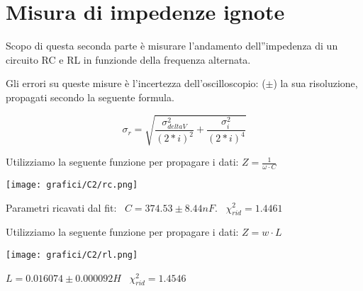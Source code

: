 %
%
%
%
%

\section{Misura di impedenze ignote}

Scopo di questa seconda parte è misurare l'andamento dell''impedenza di un circuito RC e RL in funzionde della frequenza alternata.

Gli errori su queste misure è l'incertezza dell'oscilloscopio: ($\pm$) la sua risoluzione, propagati secondo la seguente formula.

$$\sigma_r = \sqrt{\frac{\sigma_{deltaV}^2}{(2*i)^2} + \frac{\sigma_{i}^2}{(2*i)^4}}$$


Utilizziamo la seguente funzione per propagare i dati:
$Z = \frac{1}{\omega \cdot C}$

\begin{center}
\texttt{[image: grafici/C2/rc.png]} 
\end{center}
Parametri ricavati dal fit:
\
$C = 374.53\pm 8.44 nF$.
\
$\chi_{rid}^2= 1.4461 $ 


Utilizziamo la seguente funzione per propagare i dati:
$Z = w\cdot L$

\begin{center}
\texttt{[image: grafici/C2/rl.png]} 
\end{center}

$L = 0.016074\pm 0.000092 H$ \
$\chi_{rid}^2 = 1.4546$ 




